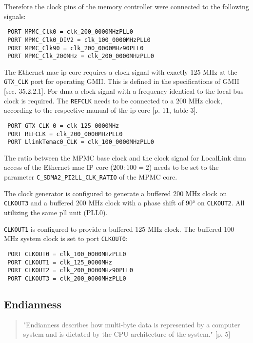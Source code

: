 Therefore the clock pins of the memory controller were connected to the following signals:

\begin{verbatim}
 PORT MPMC_Clk0 = clk_200_0000MHzPLL0
 PORT MPMC_Clk0_DIV2 = clk_100_0000MHzPLL0
 PORT MPMC_Clk90 = clk_200_0000MHz90PLL0
 PORT MPMC_Clk_200MHz = clk_200_0000MHzPLL0
\end{verbatim}

The Ethernet \gls{mac} \gls{ip} core requires a clock signal with exactly 125 MHz at the \texttt{GTX\_CLK} port for operating GMII. This is defined in the specifications of GMII \cite{ieee802_3}[sec. 35.2.2.1]. For \gls{dma} a clock signal with a frequency identical to the local bus clock is required. The \texttt{REFCLK} needs to be connected to a 200 MHz clock, according to the respective manual of the \gls{ip} core \cite{xps_ll_temac}[p. 11, table 3].

\begin{verbatim}
 PORT GTX_CLK_0 = clk_125_0000MHz
 PORT REFCLK = clk_200_0000MHzPLL0
 PORT LlinkTemac0_CLK = clk_100_0000MHzPLL0
\end{verbatim}

The ratio between the MPMC base clock and the clock signal for LocalLink \gls{dma} access of the Ethernet \gls{mac} IP core ($200:100 = 2$) needs to be set to the parameter \texttt{C\_SDMA2\_PI2LL\_CLK\_RATIO} of the MPMC core.

The clock generator is configured to generate a buffered 200 MHz clock on \texttt{CLKOUT3} and a buffered 200 MHz clock with a phase shift of 90° on \texttt{CLKOUT2}. All utilizing the same \gls{pll} unit (PLL0).

\texttt{CLKOUT1} is configured to provide a buffered 125 MHz clock. The buffered 100 MHz system clock is set to port \texttt{CLKOUT0}:

\begin{verbatim}
 PORT CLKOUT0 = clk_100_0000MHzPLL0
 PORT CLKOUT1 = clk_125_0000MHz
 PORT CLKOUT2 = clk_200_0000MHz90PLL0
 PORT CLKOUT3 = clk_200_0000MHzPLL0
\end{verbatim}


\subsection{Endianness}

\begin{quote}
 "Endianness describes how multi-byte data is represented by a computer system and is dictated by the CPU architecture of the system." \cite{intel_endiannness}[p. 5]
\end{quote}

